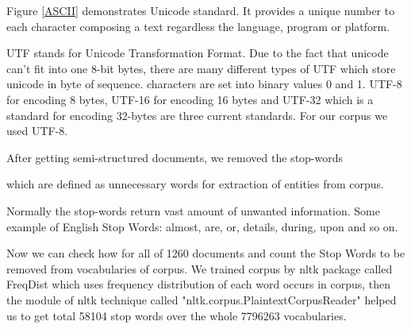Figure \ref{ASCII} demonstrates Unicode  standard.
It provides  a unique number to each character composing a text regardless the language, program  or platform.

UTF stands for Unicode Transformation Format. Due to the fact that unicode can't fit into one 8-bit bytes, there are many  different types of UTF which store unicode in byte of sequence.  characters are set into binary values 0 and 1. UTF-8 for encoding  8 bytes, UTF-16 for encoding 16 bytes and UTF-32 which is a standard for encoding 32-bytes are three current standards. For our corpus we used UTF-8.

After getting semi-structured documents, we removed the stop-words

which are defined as unnecessary words for extraction of entities from corpus.

Normally the stop-words return vast amount of unwanted information. Some example of English Stop Words: almost, are, or,  details, during, upon and so on.

Now we can check how for all of 1260 documents and count the Stop Words to be removed from vocabularies of corpus. We trained corpus by nltk package called FreqDist which uses  frequency distribution of each word occurs in corpus, then the module of nltk technique called "nltk.corpus.PlaintextCorpusReader" helped us to get total 58104 stop words over the whole  7796263  vocabularies.

